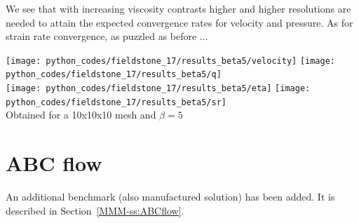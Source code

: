 We see that with increasing viscosity contrasts higher and higher resolutions are needed to 
attain the expected convergence rates for velocity and pressure. As for strain rate convergence, 
as puzzled as before ...



\begin{center}
\texttt{[image: python\_codes/fieldstone\_17/results\_beta5/velocity]}
\texttt{[image: python\_codes/fieldstone\_17/results\_beta5/q]}\\
\texttt{[image: python\_codes/fieldstone\_17/results\_beta5/eta]}
\texttt{[image: python\_codes/fieldstone\_17/results\_beta5/sr]}\\
{\captionfont Obtained for a 10x10x10 mesh and $\beta=5$}
\end{center}

\newpage
\section*{ABC flow}

An additional benchmark (also manufactured solution) has been added.
It is described in Section~\ref{MMM-ss:ABCflow}.

